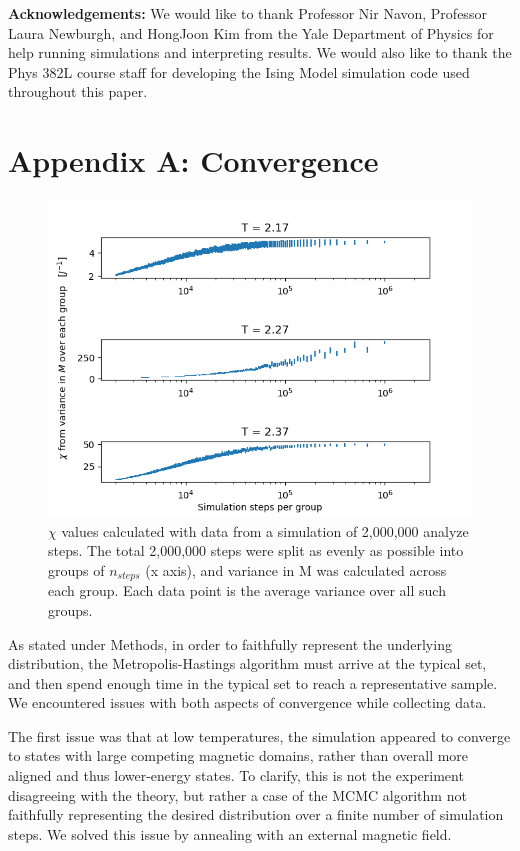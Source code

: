\documentclass[letter,scriptaddress,twocolumn, prl,nofootinbib]{revtex4}
\begin{document}
\textbf{Acknowledgements:}
	We would like to thank Professor Nir Navon, Professor Laura Newburgh, and HongJoon Kim from the Yale Department of Physics for help running simulations and interpreting results. We would also like to thank the Phys 382L course staff for developing the Ising Model simulation code used throughout this paper.
	
 


\appendix
\section{Appendix A: Convergence}

\begin{figure}[h]
	\begin{center}
		\includegraphics[width=.4\textwidth]{figs/figA1.png}
		\caption{$\chi$ values calculated with data from a simulation of 2,000,000 analyze steps. The total 2,000,000 steps were split as evenly as possible into groups of $n_{steps}$ (x axis), and variance in M was calculated across each group. Each data point is the average variance over all such groups.}
		\label{fig:figA1}
	\end{center}
\end{figure}

As stated under Methods, in order to faithfully represent the underlying distribution, the Metropolis-Hastings algorithm must arrive at the typical set, and then spend enough time in the typical set to reach a representative sample. We encountered issues with both aspects of convergence while collecting data.

The first issue was that at low temperatures, the simulation appeared to converge to states with large competing magnetic domains, rather than overall more aligned and thus lower-energy states. To clarify, this is not the experiment disagreeing with the theory, but rather a case of the MCMC algorithm not faithfully representing the desired distribution over a finite number of simulation steps. We solved this issue by annealing with an external magnetic field.
\end{document}
